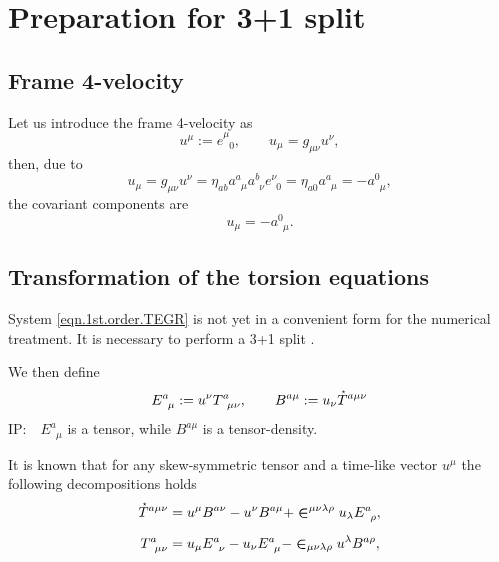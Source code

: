 \documentclass[
10pt, %
a4paper, %
oneside, %
headinclude,footinclude, %
BCOR5mm, %
]{scrartcl}
\newcommand{\IP}[1]{{\color{Red}IP:\ \ #1}}
\newcommand{\itetr}[2]{e^{#1}_{\phantom{#1}#2}}
\newcommand{\tetr}[2]{a^{#1}_{\phantom{#1}#2}}
\newcommand{\Tors}[2]{T^{#1}_{\phantom{a}#2}}
\newcommand{\ET}[2]{E^{#1}_{\phantom{#1}#2}}	%
\newcommand{\BT}[2]{B^{#1#2}}	%
\newcommand{\LCsymb}{\bm{\in}}    %
\newcommand{\HT}[1]{\accentset{\star}{T}^{#1}}
\begin{document}
\section{Preparation for 3+1 split}


\subsection{Frame 4-velocity}

Let us introduce the frame 4-velocity as
\begin{equation}\label{eqn.4velocity}
u^\mu := \itetr{\mu}{0}, \qquad u_\mu = g_{\mu\nu}u^\nu,
\end{equation}
then, due to
\begin{equation}
u_\mu = g_{\mu\nu} u^\nu = \eta_{ab}\tetr{a}{\mu}\tetr{b}{\nu}\itetr{\nu}{0} = 
\eta_{a0}\tetr{a}{\mu} = -\tetr{0}{\mu},
\end{equation}\label{eqn.4velocity.cov}
the covariant components are
\begin{equation}
u_\mu = -\tetr{0}{\mu}.
\end{equation}


\subsection{Transformation of the torsion equations}\label{sec.transform.potential}


System \eqref{eqn.1st.order.TEGR} is not yet in a convenient form for the numerical treatment. It 
is necessary to perform a 3+1 split \cite{Alcubierre2008}. 


We then define 
\begin{equation}
\ET{a}{\mu} := u^\nu \Tors{a}{\mu\nu}, \qquad  \BT{a}{\mu} := u_\nu\HT{a\mu\nu}
\end{equation}
\IP{$ \ET{a}{\mu} $ is a tensor, while $ \BT{a}{\mu} $ is a tensor-density.}

It is known that for any skew-symmetric tensor and a time-like vector $ u^\mu $ the following 
decompositions holds
\begin{subequations}\label{eqn.T.decompos}
\begin{align}
\HT{a\mu\nu} &= u^\mu \BT{a}{\nu} - u^\nu \BT{a}{\mu} + 
\LCsymb^{\mu\nu\lambda\rho}u_\lambda 
\ET{a}{\rho},\\[2mm]
\Tors{a}{\mu\nu} &= u_\mu \ET{a}{\nu} - u_\nu \ET{a}{\mu} - 
\LCsymb_{\mu\nu\lambda\rho}u^\lambda 
\BT{a}{\rho},
\end{align}
\end{subequations}
\end{document}
